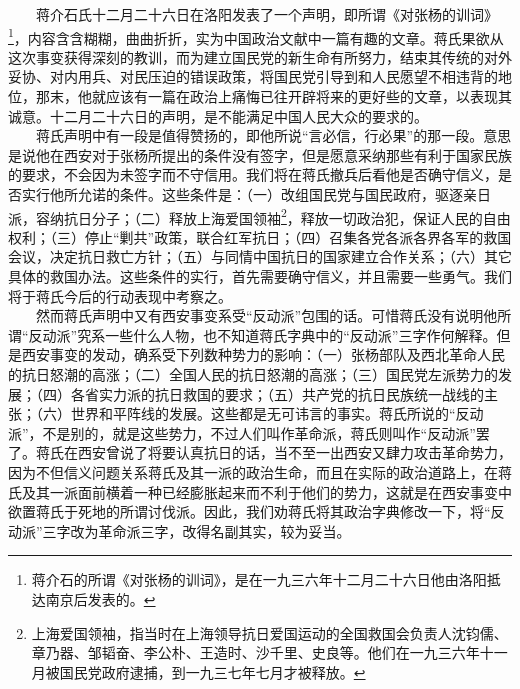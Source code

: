 \documentclass[cn,11pt,chinese]{elegantbook}
\begin{document}
　　蒋介石氏十二月二十六日在洛阳发表了一个声明，即所谓《对张杨的训词》\footnote[3]{ 蒋介石的所谓《对张杨的训词》，是在一九三六年十二月二十六日他由洛阳抵达南京后发表的。}，内容含含糊糊，曲曲折折，实为中国政治文献中一篇有趣的文章。蒋氏果欲从这次事变获得深刻的教训，而为建立国民党的新生命有所努力，结束其传统的对外妥协、对内用兵、对民压迫的错误政策，将国民党引导到和人民愿望不相违背的地位，那末，他就应该有一篇在政治上痛悔已往开辟将来的更好些的文章，以表现其诚意。十二月二十六日的声明，是不能满足中国人民大众的要求的。\\
　　蒋氏声明中有一段是值得赞扬的，即他所说“言必信，行必果”的那一段。意思是说他在西安对于张杨所提出的条件没有签字，但是愿意采纳那些有利于国家民族的要求，不会因为未签字而不守信用。我们将在蒋氏撤兵后看他是否确守信义，是否实行他所允诺的条件。这些条件是：（一）改组国民党与国民政府，驱逐亲日派，容纳抗日分子；（二）释放上海爱国领袖\footnote[4]{ 上海爱国领袖，指当时在上海领导抗日爱国运动的全国救国会负责人沈钧儒、章乃器、邹韬奋、李公朴、王造时、沙千里、史良等。他们在一九三六年十一月被国民党政府逮捕，到一九三七年七月才被释放。}，释放一切政治犯，保证人民的自由权利；（三）停止“剿共”政策，联合红军抗日；（四）召集各党各派各界各军的救国会议，决定抗日救亡方针；（五）与同情中国抗日的国家建立合作关系；（六）其它具体的救国办法。这些条件的实行，首先需要确守信义，并且需要一些勇气。我们将于蒋氏今后的行动表现中考察之。\\
　　然而蒋氏声明中又有西安事变系受“反动派”包围的话。可惜蒋氏没有说明他所谓“反动派”究系一些什么人物，也不知道蒋氏字典中的“反动派”三字作何解释。但是西安事变的发动，确系受下列数种势力的影响：（一）张杨部队及西北革命人民的抗日怒潮的高涨；（二）全国人民的抗日怒潮的高涨；（三）国民党左派势力的发展；（四）各省实力派的抗日救国的要求；（五）共产党的抗日民族统一战线的主张；（六）世界和平阵线的发展。这些都是无可讳言的事实。蒋氏所说的“反动派”，不是别的，就是这些势力，不过人们叫作革命派，蒋氏则叫作“反动派”罢了。蒋氏在西安曾说了将要认真抗日的话，当不至一出西安又肆力攻击革命势力，因为不但信义问题关系蒋氏及其一派的政治生命，而且在实际的政治道路上，在蒋氏及其一派面前横着一种已经膨胀起来而不利于他们的势力，这就是在西安事变中欲置蒋氏于死地的所谓讨伐派。因此，我们劝蒋氏将其政治字典修改一下，将“反动派”三字改为革命派三字，改得名副其实，较为妥当。\\
\end{document}

